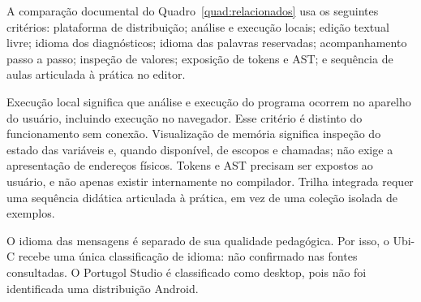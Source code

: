 \documentclass[
    12pt
    ,oneside
    ,a4paper
    ,chapter=TITLE
    ,section=TITLE
    ,sumario=abnt-6027-2012]{abntex2}
\begin{document}
A comparação documental do Quadro~\ref{quad:relacionados} usa os seguintes critérios:
plataforma de distribuição; análise e execução locais; edição textual livre;
idioma dos diagnósticos; idioma das palavras reservadas; acompanhamento passo a
passo; inspeção de valores; exposição de tokens e AST; e sequência de aulas
articulada à prática no editor.

Execução local significa que análise e execução do programa ocorrem no aparelho
do usuário, incluindo execução no navegador. Esse critério é distinto do funcionamento sem conexão. Visualização de memória significa
inspeção do estado das variáveis e, quando disponível, de escopos e chamadas;
não exige a apresentação de endereços físicos. Tokens e AST precisam ser
expostos ao usuário, e não apenas existir internamente no compilador.
Trilha integrada requer uma sequência didática articulada à prática, em vez
de uma coleção isolada de exemplos.

O idioma das mensagens é separado de sua qualidade pedagógica. Por isso,
o Ubi-C recebe uma única classificação de idioma: não confirmado nas fontes
consultadas. O Portugol Studio é classificado como desktop, pois não foi
identificada uma distribuição Android.
\end{document}

